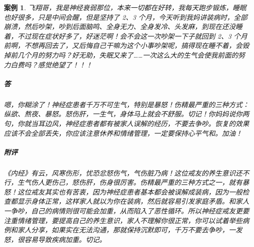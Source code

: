 \documentclass{ctexart}
\newtheorem{case}{案例}
\begin{document}
\begin{case}
    飞翔哥，我是神经衰弱那位，本来一切都在好转，我每天跑步锻炼，睡眠也好很多，只是中间会醒，但是坚持了 2、3 个月，今天听到我妈讲装病时，全部崩溃，然后吵架，吵到后面脑鸣、全身无力、全身发冷、头发麻，到现在还没睡着，不过现在症状好多了，好迷茫啊！会不会这一次吵架一下子就回到 2、3 个月前啊，不想再回去了，又后悔自己干嘛为这个小事吵架呢，搞得现在睡不着，会毁掉前几个月的努力吗？好无助，失眠又来了……一次这么大的生气会使我前面的努力白费吗？感觉绝望了！！！
    \subparagraph{答} 嗯，你糊涂了！神经症患者千万不可生气，特别是暴怒！伤精最严重的三种方式：纵欲、熬夜、暴怒。怒伤肝，一生气，身体马上就会不舒服。切记！你妈妈说你两句，你就当耳边风，神经症患者都有被家人误解的经历，不要去争吵。恢复的效果应该不会全部丢失，你应该注意休养和情绪管理，一定要保持心平气和。加油！
    \subparagraph{附评} 《内经》有云，风寒伤形，忧恐忿怒伤气，气伤脏乃病！这位戒友的养生意识还不行，生气伤人更伤己，怒伤肝，伤身很厉害。伤精最严重的三种方式之一，就有暴怒！这位戒友其实也有苦衷，因为神经症患者基本都会被误解成装病，因为一般检查都显示身体正常，这样家人就以为你在装病，然后就容易引发家庭矛盾。和家人一争吵，自己的病情则很可能会加重，从而陷入了恶性循环。所以神经症戒友更要注重情绪管理，要提高自己的养生意识，家人不理解你很正常，你可以试着举些病例和家人分享，如果实在无法沟通，那就保持沉默即可，千万不要去争吵，一发怒，很容易导致疾病加重。切记。
\end{case}
\end{document}
